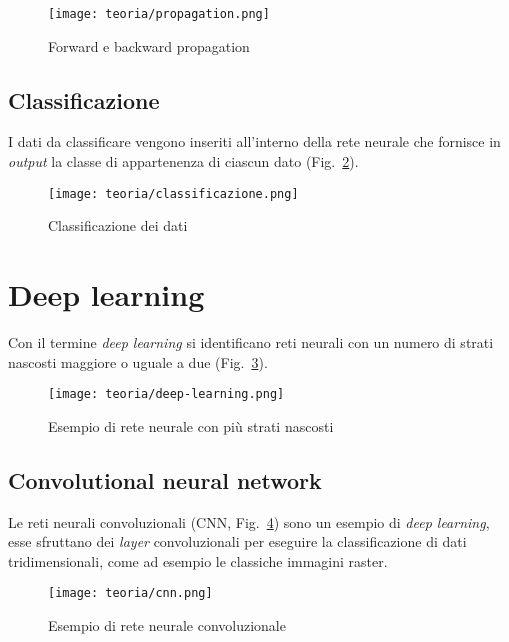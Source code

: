 \begin{figure}[!h] 
    \centering 
    \texttt{[image: teoria/propagation.png]} 
    \caption{Forward e backward propagation}
    \label{fig:propagation}
  \end{figure}


\subsection{Classificazione}
I dati da classificare vengono inseriti all'interno della rete neurale che fornisce in \emph{output} la classe di appartenenza di ciascun dato (Fig.~\ref{fig:classificazione}).

\begin{figure}[!h] 
    \centering 
    \texttt{[image: teoria/classificazione.png]} 
    \caption{Classificazione dei dati}
    \label{fig:classificazione}
  \end{figure}

\newpage

\section{Deep learning}
Con il termine \emph{deep learning} si identificano reti neurali con un numero di strati nascosti maggiore o uguale a due (Fig.~\ref{fig:deep-learning}).

\begin{figure}[!h] 
    \centering 
    \texttt{[image: teoria/deep-learning.png]} 
    \caption{Esempio di rete neurale con più strati nascosti}
    \label{fig:deep-learning}
  \end{figure}

\subsection{Convolutional neural network}
Le reti neurali convoluzionali (CNN, Fig.~\ref{fig:cnn}) sono un esempio di \emph{deep learning}, esse sfruttano dei \emph{layer} convoluzionali per eseguire la classificazione di dati tridimensionali, come ad esempio le classiche immagini raster.

\begin{figure}[!h] 
    \centering 
    \texttt{[image: teoria/cnn.png]} 
    \caption{Esempio di rete neurale convoluzionale}
    \label{fig:cnn}
  \end{figure}

\newpage

